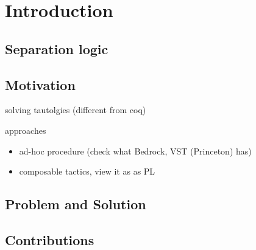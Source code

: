 \chapter{Introduction}


\section{Separation logic}

\section{Motivation}

solving tautolgies (different from coq)

approaches
  \begin{itemize}
  \item ad-hoc procedure (check what Bedrock, VST (Princeton) has)
  \item composable tactics, view it as as PL
  \end{itemize}

\section{Problem and Solution}

\section{Contributions}



